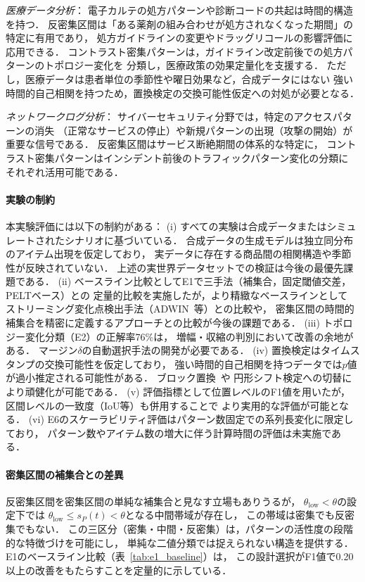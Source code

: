 \emph{医療データ分析}：
電子カルテの処方パターンや診断コードの共起は時間的構造を持つ．
反密集区間は「ある薬剤の組み合わせが処方されなくなった期間」の特定に有用であり，
処方ガイドラインの変更やドラッグリコールの影響評価に応用できる．
コントラスト密集パターンは，ガイドライン改定前後での処方パターンのトポロジー変化を
分類し，医療政策の効果定量化を支援する．
ただし，医療データは患者単位の季節性や曜日効果など，合成データにはない
強い時間的自己相関を持つため，置換検定の交換可能性仮定への対処が必要となる．

\emph{ネットワークログ分析}：
サイバーセキュリティ分野では，特定のアクセスパターンの消失
（正常なサービスの停止）や新規パターンの出現（攻撃の開始）が重要な信号である．
反密集区間はサービス断絶期間の体系的な特定に，
コントラスト密集パターンはインシデント前後のトラフィックパターン変化の分類に
それぞれ活用可能である．

\paragraph{実験の制約}
本実験評価には以下の制約がある：
(i) すべての実験は合成データまたはシミュレートされたシナリオに基づいている．
合成データの生成モデルは独立同分布のアイテム出現を仮定しており，
実データに存在する商品間の相関構造や季節性が反映されていない．
上述の実世界データセットでの検証は今後の最優先課題である．
(ii) ベースライン比較としてE1で三手法（補集合，固定閾値交差，PELTベース）との
定量的比較を実施したが，より精緻なベースラインとして
ストリーミング変化点検出手法（ADWIN~\cite{bifet2007adwin}等）との比較や，
密集区間の時間的補集合を精密に定義するアプローチとの比較が今後の課題である．
(iii) トポロジー変化分類（E2）の正解率76\%は，
増幅・収縮の判別において改善の余地がある．
マージン$\delta$の自動選択手法の開発が必要である．
(iv) 置換検定はタイムスタンプの交換可能性を仮定しており，
強い時間的自己相関を持つデータでは$p$値が過小推定される可能性がある．
ブロック置換~\cite{westfall1993permutation}や
円形シフト検定への切替により頑健化が可能である．
(v) 評価指標として位置レベルのF1値を用いたが，
区間レベルの一致度（IoU等）も併用することで
より実用的な評価が可能となる．
(vi) E6のスケーラビリティ評価はパターン数固定での系列長変化に限定しており，
パターン数やアイテム数の増大に伴う計算時間の評価は未実施である．

\paragraph{密集区間の補集合との差異}
反密集区間を密集区間の単純な補集合と見なす立場もありうるが，
$\theta_{\text{low}} < \theta$の設定下では
$\theta_{\text{low}} \leq s_P(t) < \theta$となる中間帯域が存在し，
この帯域は密集でも反密集でもない．
この三区分（密集・中間・反密集）は，パターンの活性度の段階的な特徴づけを可能にし，
単純な二値分類では捉えられない構造を提供する．
E1のベースライン比較（表~\ref{tab:e1_baseline}）は，
この設計選択がF1値で0.20以上の改善をもたらすことを定量的に示している．
